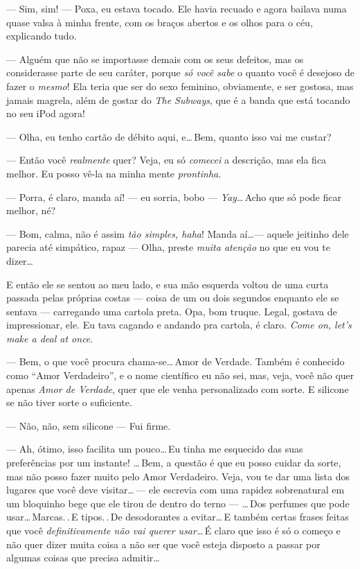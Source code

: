 --- Sim, sim! --- Poxa, eu estava tocado. Ele havia recuado e agora bailava numa quase valsa à minha frente, com os braços abertos e os olhos para o céu, explicando tudo.

--- Alguém que não se importasse demais com os seus defeitos, mas os considerasse parte de seu caráter, porque \emph{só você sabe} o quanto você é desejoso de fazer o \emph{mesmo}! Ela teria que ser do sexo feminino, obviamente, e ser gostosa, mas jamais magrela, além de gostar do \emph{The Subways}, que é a banda que está tocando no seu iPod agora!

--- Olha, eu tenho cartão de débito aqui, e\ldots\,Bem, quanto isso vai me custar?

--- Então você \emph{realmente} quer? Veja, eu só \emph{comecei} a descrição, mas ela fica melhor. Eu posso vê-la na minha mente \emph{prontinha}.

--- Porra, é claro, manda aí! --- eu sorria, bobo --- \emph{Yay}\ldots\,Acho que só pode ficar melhor, né?

--- Bom, calma, não é assim \emph{tão simples, haha}! Manda aí\ldots --- aquele jeitinho dele parecia até simpático, rapaz --- Olha, preste \emph{muita atenção} no que eu vou te dizer\ldots

E então ele se sentou ao meu lado, e sua mão esquerda voltou de uma curta passada pelas próprias costas --- coisa de um ou dois segundos enquanto ele se sentava --- carregando uma cartola preta. Opa, bom truque. Legal, gostava de impressionar, ele. Eu tava cagando e andando pra cartola, é claro. \foreignlanguage{english}{\emph{Come on, let's make a deal at once}}.

--- Bem, o que você procura chama-se\ldots\,Amor de Verdade. Também é conhecido como ``Amor Verdadeiro'', e o nome científico eu não sei, mas, veja, você não quer apenas \emph{Amor de Verdade}, quer que ele venha personalizado com sorte. E silicone se não tiver sorte o suficiente.

--- Não, não, sem silicone --- Fui firme.

--- Ah, ótimo, isso facilita um pouco\ldots\,Eu tinha me esquecido das suas preferências por um instante! \ldots\,Bem, a questão é que eu posso cuidar da sorte, mas não posso fazer muito pelo Amor Verdadeiro. Veja, vou te dar uma lista dos lugares que você deve visitar\ldots\,--- ele escrevia com uma rapidez sobrenatural em um bloquinho bege que ele tirou de dentro do terno ---  \ldots\,Dos perfumes que pode usar\ldots\,Marcas.\,.\,E tipos.\,.\,De desodorantes a evitar\ldots\,E também certas frases feitas que você \emph{definitivamente não vai querer usar}\ldots\,É claro que isso é só o começo e não quer dizer muita coisa a não ser que você esteja disposto a passar por algumas coisas que precisa admitir\ldots

